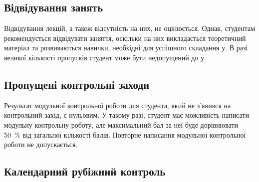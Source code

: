 \documentclass{Syllabus}
\begin{document}

\subsection*{Відвідування занять}
Відвідування лекцій, а також відсутність на них, не оцінюється. Однак, студентам рекомендується відвідувати заняття, оскільки на них викладається теоретичний матеріал та розвиваються навички, необхідні для успішного складання \control у. В разі великої кількості пропусків студент може бути недопущений до \control у.

\subsection*{Пропущені контрольні заходи}

Результат модульної контрольної роботи для студента, який не з’явився на контрольний захід, є нульовим. У такому разі, студент має можливість написати модульну контрольну роботу, але максимальний бал за неї буде дорівнювати 50~\% від загальної кількості балів. Повторне написання модульної контрольної роботи не допускається.

\subsection*{Календарний рубіжний контроль}
\end{document}

